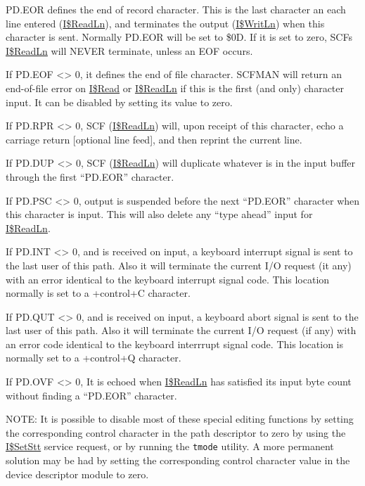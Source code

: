 \documentclass[
]{article}
\begin{document}
PD.EOR defines the end of record character. This is the last character
an each line entered (\hyperref[i.readln]{I\$ReadLn}), and terminates
the output (\hyperref[i.writln]{I\$WritLn}) when this character is sent.
Normally PD.EOR will be set to \$0D. If it is set to zero,
SCF\textquotesingle s \hyperref[i.readln]{I\$ReadLn} will NEVER
terminate, unless an EOF occurs.

If PD.EOF \textless\textgreater{} 0, it defines the end of file
character. SCFMAN will return an end-of-file error on
\hyperref[i.read]{I\$Read} or \hyperref[i.readln]{I\$ReadLn} if this is
the first (and only) character input. It can be disabled by setting its
value to zero.

If PD.RPR \textless\textgreater{} 0, SCF
(\hyperref[i.readln]{I\$ReadLn}) will, upon receipt of this character,
echo a carriage return {[}optional line feed{]}, and then reprint the
current line.

If PD.DUP \textless\textgreater{} 0, SCF
(\hyperref[i.readln]{I\$ReadLn}) will duplicate whatever is in the input
buffer through the first ``PD.EOR'' character.

If PD.PSC \textless\textgreater{} 0, output is suspended before the next
``PD.EOR'' character when this character is input. This will also delete
any ``type ahead'' input for \hyperref[i.readln]{I\$ReadLn}.

If PD.INT \textless\textgreater{} 0, and is received on input, a
keyboard interrupt signal is sent to the last user of this path. Also it
will terminate the current I/O request (it any) with an error identical
to the keyboard interrupt signal code. This location normally is set to
a { +control+C} character.

If PD.QUT \textless\textgreater{} 0, and is received on input, a
keyboard abort signal is sent to the last user of this path. Also it
will terminate the current I/O request (if any) with an error code
identical to the keyboard interrrupt signal code. This location is
normally set to a { +control+Q} character.

If PD.OVF \textless\textgreater{} 0, It is echoed when
\hyperref[i.readln]{I\$ReadLn} has satisfied its input byte count
without finding a ``PD.EOR'' character.

NOTE: It is possible to disable most of these special editing functions
by setting the corresponding control character in the path descriptor to
zero by using the \hyperref[i.setstt]{I\$SetStt} service request, or by
running the \texttt{tmode} utility. A more permanent solution may be had
by setting the corresponding control character value in the device
descriptor module to zero.
\end{document}
